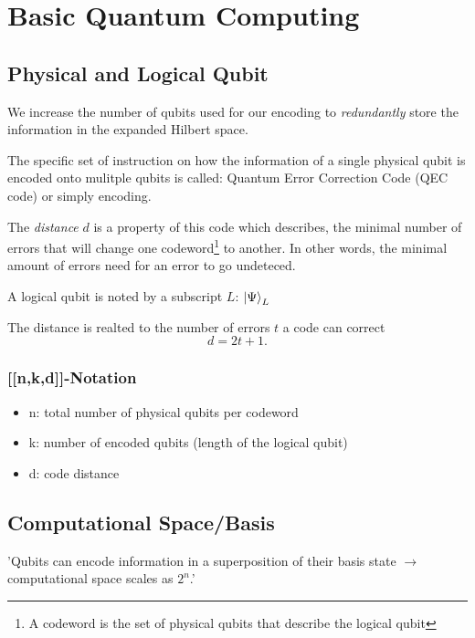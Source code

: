 \section{Basic Quantum Computing}

\subsection{Physical and Logical Qubit}

We increase the number of qubits used for our encoding to \textit{redundantly} store the information in the expanded Hilbert space. \cite{QECintro}

The specific set of instruction on how the information of a single physical 
qubit is encoded onto mulitple qubits is called:
Quantum Error Correction Code (QEC code) or simply encoding. \cite{QECintro}

The \textit{distance} $d$ is a property of this code which describes, 
the minimal number of errors that will change one 
codeword\footnote{A codeword is the set of physical qubits that describe the logical qubit} to another.
In other words, the minimal amount of errors need for an error to go undeteced. \cite{QECintro}

A logical qubit is noted by a subscript $L$: $\ket{\Psi}_L$

The distance is realted to the number of errors $t$ a code can correct
\begin{equation}
    d = 2t+1.
\end{equation}
 \cite{QECintro}
\subsubsection{[[n,k,d]]-Notation}
\cite{QECintro}
\begin{itemize}
    \item n: total number of physical qubits per codeword
    \item k: number of encoded qubits (length of the logical qubit)
    \item d: code distance
\end{itemize}
 
\subsection{Computational Space/Basis}

'Qubits can encode information in a superposition of their basis state $\rightarrow$ computational space scales as $2^n$.' \cite{QECintro}

